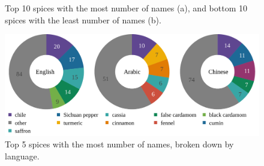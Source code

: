 \begin{figure}[!ht]
	\centering
	\hfill
	\caption[Top and bottom spices by number of names.]{Top 10 spices with the most number of names (a), and bottom 10 spices with the least number of names (b).}
	\label{fig:ids_top_and_bottom_ann}
\end{figure}

\begin{figure}[!ht]
	\centering
	\includegraphics[width=\linewidth]{imgs/plots/ids_trio.pdf}
	\caption[Top spices by number of names, broken down by language.]{Top 5 spices with the most number of names, broken down by language.}
	\label{fig:ids_trio}
\end{figure}



